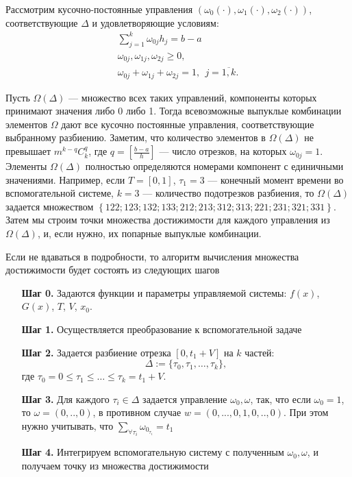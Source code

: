 \documentclass[a4paper,12pt]{article}
\begin{document}
Рассмотрим кусочно-постоянные управления
$(\omega_0(\cdot),\omega_1(\cdot),\omega_2(\cdot))$, соответствующие
$\Delta$ и удовлетворяющие условиям:
\begin{equation*}
    \begin{array}{l}
        \sum_{j=1}^k \omega_{0j}h_j=b-a\\
        \omega_{0j}, \omega_{1j}, \omega_{2j} \geq 0,\\ 
        \omega_{0j}+ \omega_{1j}+ \omega_{2j} =1, \ \ j=\overline{1,k}.
    \end{array}
\end{equation*}

Пусть $\Omega(\Delta)$ --- множество всех таких управлений, компоненты
которых принимают значения либо 0 либо 1. Тогда всевозможные выпуклые
комбинации элементов $\Omega$ дают все кусочно постоянные управления,
соответствующие выбранному разбиению.  Заметим, что количество
элементов в $\Omega(\Delta)$ не превышает $m^{k-q} C_k^q$, где
$q=\left[\frac{b-a}{h}\right]$ --- число отрезков, на которых
$\omega_{0j}=1$.  Элементы $\Omega(\Delta)$ полностью определяются
номерами компонент с единичными значениями. Например, если $T=[0,1]$,
$\tau_1=3$ --- конечный момент времени во вспомогательной системе,
$k=3$ --- количество подотрезков разбиения, то $\Omega(\Delta)$
задается множеством
$\left\{122; 123 ; 132 ; 133 ;212 ; 213; 312 ; 313 ; 221; 231 ; 321 ;
331 \right\}$.
Затем мы строим точки множества достижимости для каждого управления из
$\Omega(\Delta)$, и, если нужно, их попарные выпуклые комбинации.

Если не вдаваться в подробности, то алгоритм вычисления множества
достижимости будет состоять из следующих шагов
\begin{itemize}
    \item[\bf Шаг 0.] Задаются функции и параметры управляемой системы: $f(x)$, $G(x)$, $T$, $V$, $x_0.$
    \item[\bf Шаг 1.] Осуществляется преобразование к вспомогательной задаче
    \item[\bf Шаг 2.] Задается разбиение отрезка $[0,t_1+V]$
        на $k$ частей:    \begin{equation} \Delta:=\big\{ \tau_{0}, \tau_{1}, \ldots,
            \tau_{k}  \big\},
        \end{equation} где $\tau_{0}=0 \leq \tau_{1}\leq \ldots \leq \tau_{k}=t_1+V.$

    \item[\bf Шаг 3.] Для каждого $\tau_{i}\in \Delta$ задается управление $\omega_0, \omega$, так, что если $\omega_0 = 1$, то $\omega = (0,..,0)$, в противном случае $w = (0,...,0,1,0,..,0)$. При этом нужно учитывать, что $\sum\limits_{\forall \tau_{i}} \omega_{0_{\tau_{i}}} = t_1$
    \item[\bf Шаг 4.] Интегрируем вспомогательную систему с полученным $\omega_0, \omega$, и получаем точку из множества достижимости
\end{itemize}
\end{document}
